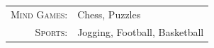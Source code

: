 \begin{tabular}{rl}
    \textsc{Mind Games:} & Chess, Puzzles \\
    \textsc{Sports:} & Jogging, Football, Basketball \\
\end{tabular}